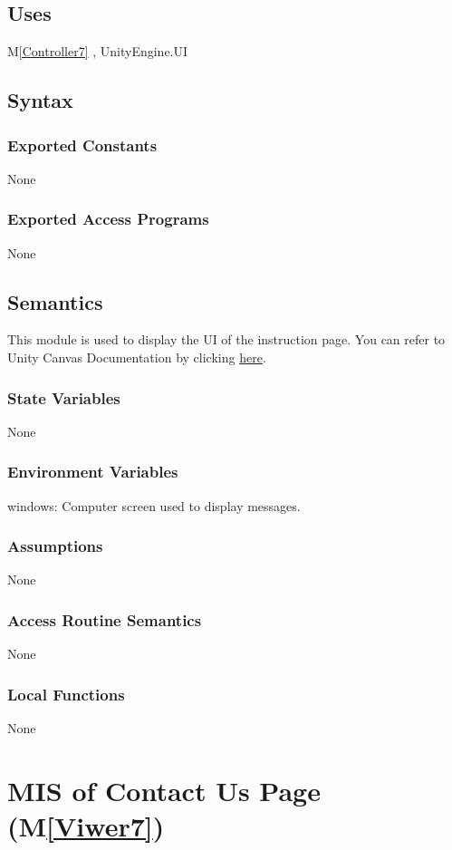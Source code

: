 \documentclass[12pt, titlepage]{article}
\newcommand{\mref}[1]{M\ref{#1}}
\begin{document}
\subsection{Uses}
\mref{Controller7} ,
UnityEngine.UI

\subsection{Syntax}
\subsubsection{Exported Constants}
None
\subsubsection{Exported Access Programs}
None

\subsection{Semantics}
This module is used to display the UI of the instruction page. 
You can refer to Unity Canvas Documentation by clicking 
\href{https://docs.unity3d.com/Packages/com.unity.ugui@1.0/manual/class-Canvas.html}{here}.
\subsubsection{State Variables}
None
\subsubsection{Environment Variables}
windows: Computer screen used to display messages.
\subsubsection{Assumptions}
None
\subsubsection{Access Routine Semantics}
None
\subsubsection{Local Functions}
None

\newpage

\section{MIS of Contact Us Page (\mref{Viwer7})}
\end{document}
